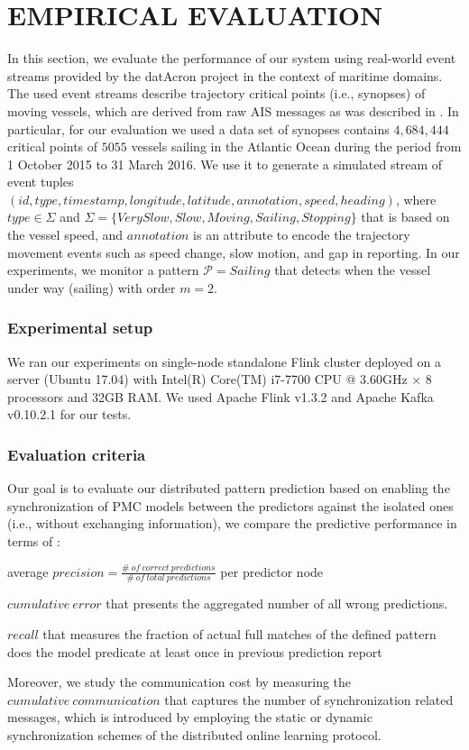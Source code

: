 \section{EMPIRICAL EVALUATION}
\label{sec:results}
In this section, we evaluate the performance of our system using real-world event streams provided by the datAcron project in the context of maritime domains. The used event streams describe trajectory critical points (i.e., synopses) of moving vessels, which are derived from raw AIS messages as was  described in \cite{synopses1}. In particular, for our evaluation we used a data set of synopses contains $4,684,444$ critical points of $5055$ vessels sailing in the Atlantic Ocean during the period from 1 October 2015 to 31 March 2016. We use it to generate a simulated stream of event tuples  $(id,type,timestamp,longitude,latitude,annotation,speed,heading)$,  where $type \in \Sigma$ and $\Sigma=\{VerySlow,Slow,Moving,Sailing,Stopping\}$ that is based on the  vessel speed, and $annotation$ is an attribute to encode the trajectory movement events such as speed change, slow motion, and gap in reporting. In our experiments, we monitor a pattern $\mathcal{P}=Sailing$ that detects when the vessel under way (sailing) with order $m=2$.


\subsubsection*{Experimental setup} We ran our experiments on single-node standalone Flink cluster deployed on a server (Ubuntu 17.04) with Intel(R) Core(TM) i7-7700 CPU @ 3.60GHz × 8 processors and 32GB RAM. We used Apache Flink v1.3.2 and Apache Kafka v0.10.2.1 for our tests.


\subsubsection*{Evaluation criteria} Our goal is to evaluate our distributed pattern prediction based on enabling the synchronization of PMC models between the predictors against the isolated ones (i.e., without exchanging information), we compare the predictive performance in terms of :
\begin{enumerate*}[label=(\roman*)]
	
\item  average $\mathit{precision = \frac{\#\ of\ correct\ predictions}{\#\ of\ total\ predictions}}$ per predictor node

\item $\mathit{cumulative\ error}$ that presents the aggregated number of all wrong predictions.

\item $\mathit{recall}$ that measures the fraction of actual full matches of the defined pattern does the model predicate at least once in previous prediction report

\end{enumerate*} 
Moreover, we study the communication cost by measuring the $\mathit{cumulative\ communication}$ that captures the number of  synchronization related messages, which is introduced by employing the static or dynamic synchronization schemes of the distributed online learning protocol. 

